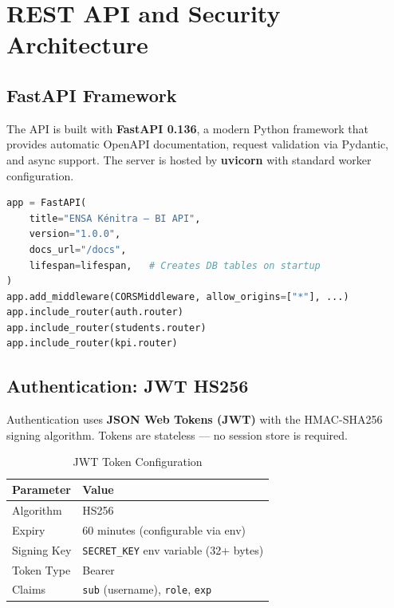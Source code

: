 \documentclass[12pt, a4paper]{report}
\begin{document}
\chapter{REST API and Security Architecture}

\section{FastAPI Framework}

The API is built with \textbf{FastAPI 0.136}, a modern Python framework that provides automatic OpenAPI documentation, request validation via Pydantic, and async support. The server is hosted by \textbf{uvicorn} with standard worker configuration.

\begin{lstlisting}[language=Python, caption={FastAPI Application Bootstrap}]
app = FastAPI(
    title="ENSA Kénitra — BI API",
    version="1.0.0",
    docs_url="/docs",
    lifespan=lifespan,   # Creates DB tables on startup
)
app.add_middleware(CORSMiddleware, allow_origins=["*"], ...)
app.include_router(auth.router)
app.include_router(students.router)
app.include_router(kpi.router)
\end{lstlisting}

\section{Authentication: JWT HS256}

Authentication uses \textbf{JSON Web Tokens (JWT)} with the HMAC-SHA256 signing algorithm. Tokens are stateless — no session store is required.

\begin{table}[H]
\centering
\caption{JWT Token Configuration}
\label{tab:jwt_config}
\begin{tabular}{@{}ll@{}}
\toprule
\textbf{Parameter} & \textbf{Value} \\
\midrule
Algorithm         & HS256 \\
Expiry            & 60 minutes (configurable via env) \\
Signing Key       & \texttt{SECRET\_KEY} env variable (32+ bytes) \\
Token Type        & Bearer \\
Claims            & \texttt{sub} (username), \texttt{role}, \texttt{exp} \\
\bottomrule
\end{tabular}
\end{table}
\end{document}
